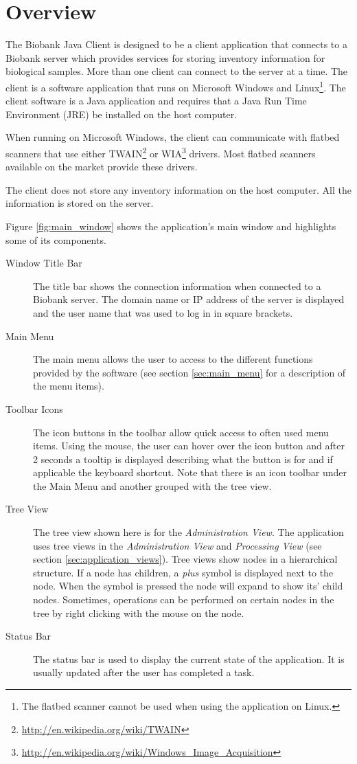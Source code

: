 \chapter{Overview}
The Biobank Java Client is designed to be a client application that connects to
a Biobank server which provides services for storing inventory information for
biological samples. More than one client can connect to the server at a
time. The client is a software application that runs on Microsoft Windows and
Linux\footnote{The flatbed scanner cannot be used when using the application on
  Linux.}. The client software is a Java application and requires that a Java
Run Time Environment (JRE) be installed on the host computer.

When running on Microsoft Windows, the client can communicate with flatbed
scanners that use either
TWAIN\footnote{\url{http://en.wikipedia.org/wiki/TWAIN}} or
WIA\footnote{\url{http://en.wikipedia.org/wiki/Windows_Image_Acquisition}}
drivers. Most flatbed scanners available on the market provide these
drivers.

The client does not store any inventory information on the host computer. All
the information is stored on the server.

Figure \ref{fig:main_window} shows the application's main window and highlights
some of its components.

\begin{description}
\item[Window Title Bar] The title bar shows the connection information when
  connected to a Biobank server. The domain name or IP address of the server
  is displayed and the user name that was used to log in in square brackets.
\item[Main Menu] The main menu allows the user to access to the different
  functions provided by the software (see section \ref{sec:main_menu} for a
  description of the menu items).
\item[Toolbar Icons] The icon buttons in the toolbar allow quick access to
  often used menu items. Using the mouse, the user can hover over the icon
  button and after 2 seconds a tooltip is displayed describing what the
  button is for and if applicable the keyboard shortcut. Note that there is
  an icon toolbar under the Main Menu and another grouped with the tree view.
\item[Tree View] The tree view shown here is for the \emph{Administration
  View}. The application uses tree views in the \emph{Administration View}
  and \emph{Processing View} (see section \ref{sec:application_views}). Tree
  views show nodes in a hierarchical structure. If a node has children, a
  \emph{plus} symbol is displayed next to the node. When the symbol is
  pressed the node will expand to show its' child nodes.  Sometimes,
  operations can be performed on certain nodes in the tree by right clicking
  with the mouse on the node.
\item[Status Bar] The status bar is used to display the current state of the
  application. It is usually updated after the user has completed a task.
\end{description}

